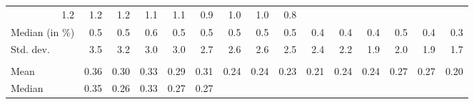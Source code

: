 \begin{tabular}{lllllllllllllll}
  \multicolumn{1}{r}{1.2} &
  \multicolumn{1}{r}{1.2} &
  \multicolumn{1}{r}{1.2} &
  \multicolumn{1}{r}{1.1} &
  \multicolumn{1}{r}{1.1} &
  \multicolumn{1}{r}{0.9} &
  \multicolumn{1}{r}{1.0} &
  \multicolumn{1}{r}{1.0} &
  \multicolumn{1}{r}{0.8} \\
\multicolumn{1}{l}{\hspace{2em}Median (in $\%$)} &
  \multicolumn{1}{|r}{0.5} &
  \multicolumn{1}{r}{0.5} &
  \multicolumn{1}{r}{0.6} &
  \multicolumn{1}{r}{0.5} &
  \multicolumn{1}{r}{0.5} &
  \multicolumn{1}{r}{0.5} &
  \multicolumn{1}{r}{0.5} &
  \multicolumn{1}{r}{0.5} &
  \multicolumn{1}{r}{0.4} &
  \multicolumn{1}{r}{0.4} &
  \multicolumn{1}{r}{0.4} &
  \multicolumn{1}{r}{0.5} &
  \multicolumn{1}{r}{0.4} &
  \multicolumn{1}{r}{0.3} \\
\multicolumn{1}{l}{\hspace{2em}Std. dev.} &
  \multicolumn{1}{|r}{3.5} &
  \multicolumn{1}{r}{3.2} &
  \multicolumn{1}{r}{3.0} &
  \multicolumn{1}{r}{3.0} &
  \multicolumn{1}{r}{2.7} &
  \multicolumn{1}{r}{2.6} &
  \multicolumn{1}{r}{2.6} &
  \multicolumn{1}{r}{2.5} &
  \multicolumn{1}{r}{2.4} &
  \multicolumn{1}{r}{2.2} &
  \multicolumn{1}{r}{1.9} &
  \multicolumn{1}{r}{2.0} &
  \multicolumn{1}{r}{1.9} &
  \multicolumn{1}{r}{1.7} \\
\multicolumn{1}{l}{\hspace{1em}{\textit{Elasticity} ($\widehat{\beta}$)}} &
  \multicolumn{1}{|r}{} &
  \multicolumn{1}{r}{} &
  \multicolumn{1}{r}{} &
  \multicolumn{1}{r}{} &
  \multicolumn{1}{r}{} &
  \multicolumn{1}{r}{} &
  \multicolumn{1}{r}{} &
  \multicolumn{1}{r}{} &
  \multicolumn{1}{r}{} &
  \multicolumn{1}{r}{} &
  \multicolumn{1}{r}{} &
  \multicolumn{1}{r}{} &
  \multicolumn{1}{r}{} &
  \multicolumn{1}{r}{} \\
\multicolumn{1}{l}{\hspace{2em}Mean } &
  \multicolumn{1}{|r}{0.36} &
  \multicolumn{1}{r}{0.30} &
  \multicolumn{1}{r}{0.33} &
  \multicolumn{1}{r}{0.29} &
  \multicolumn{1}{r}{0.31} &
  \multicolumn{1}{r}{0.24} &
  \multicolumn{1}{r}{0.24} &
  \multicolumn{1}{r}{0.23} &
  \multicolumn{1}{r}{0.21} &
  \multicolumn{1}{r}{0.24} &
  \multicolumn{1}{r}{0.24} &
  \multicolumn{1}{r}{0.27} &
  \multicolumn{1}{r}{0.27} &
  \multicolumn{1}{r}{0.20} \\
\multicolumn{1}{l}{\hspace{2em}Median } &
  \multicolumn{1}{|r}{0.35} &
  \multicolumn{1}{r}{0.26} &
  \multicolumn{1}{r}{0.33} &
  \multicolumn{1}{r}{0.27} &
  \multicolumn{1}{r}{0.27} &

\end{tabular}

